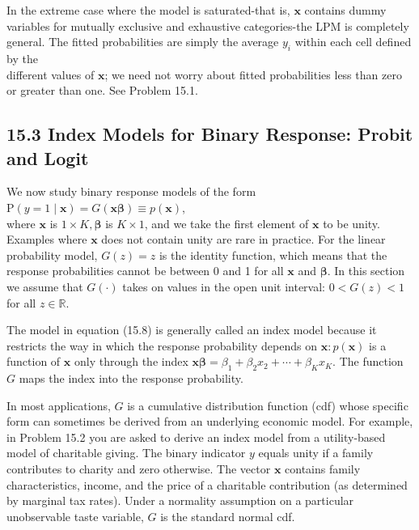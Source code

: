 \documentclass[10pt]{article}
\begin{document}
In the extreme case where the model is saturated-that is, $\mathbf{x}$ contains dummy variables for mutually exclusive and exhaustive categories-the LPM is completely general. The fitted probabilities are simply the average $y_{i}$ within each cell defined by the\\
different values of $\mathbf{x}$; we need not worry about fitted probabilities less than zero or greater than one. See Problem 15.1.

\subsection*{15.3 Index Models for Binary Response: Probit and Logit}
We now study binary response models of the form\\
$\mathrm{P}(y=1 \mid \mathbf{x})=G(\mathbf{x} \boldsymbol{\beta}) \equiv p(\mathbf{x})$,\\
where $\mathbf{x}$ is $1 \times K, \boldsymbol{\beta}$ is $K \times 1$, and we take the first element of $\mathbf{x}$ to be unity. Examples where $\mathbf{x}$ does not contain unity are rare in practice. For the linear probability model, $G(z)=z$ is the identity function, which means that the response probabilities cannot be between 0 and 1 for all $\mathbf{x}$ and $\boldsymbol{\beta}$. In this section we assume that $G(\cdot)$ takes on values in the open unit interval: $0<G(z)<1$ for all $z \in \mathbb{R}$.

The model in equation (15.8) is generally called an index model because it restricts the way in which the response probability depends on $\mathbf{x}: p(\mathbf{x})$ is a function of $\mathbf{x}$ only through the index $\mathbf{x} \boldsymbol{\beta}=\beta_{1}+\beta_{2} x_{2}+\cdots+\beta_{K} x_{K}$. The function $G$ maps the index into the response probability.

In most applications, $G$ is a cumulative distribution function (cdf) whose specific form can sometimes be derived from an underlying economic model. For example, in Problem 15.2 you are asked to derive an index model from a utility-based model of charitable giving. The binary indicator $y$ equals unity if a family contributes to charity and zero otherwise. The vector $\mathbf{x}$ contains family characteristics, income, and the price of a charitable contribution (as determined by marginal tax rates). Under a normality assumption on a particular unobservable taste variable, $G$ is the standard normal cdf.
\end{document}
